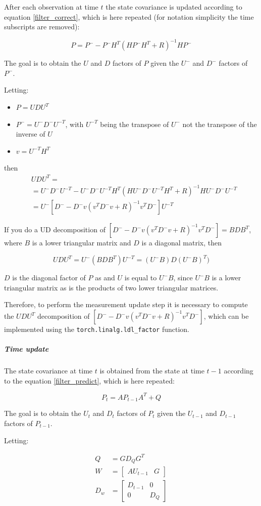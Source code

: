 \documentclass{article}
\begin{document}
After each observation at time $t$ the state covariance is updated according to equation \ref{filter_correct}, which is here repeated (for notation simplicity the time subscripts are removed):

$$ P = P^- - P^-H^T(HP^-H^T + R)^{-1}HP^-$$

The goal is to obtain the $U$ and $D$ factors of $P$ given the $U^-$ and $D^-$ factors of $P^-$.

Letting:
\begin{itemize}
    \item $P = UDU^T$
    \item $P^- = U^-D^-U^{-T}$, with $U^{-T}$ being the transpose of $U^-$ not the transpose of the inverse of $U$
    \item $v = U^{-T}H^T$
\end{itemize}
then 
\begin{align}
    &UDU^T = \\
    &= U^-D^-U^{-T} - U^-D^-U^{-T}H^T\left(HU^-D^-U^{-T}H^T + R\right)^{-1}HU^-D^-U^{-T} \\
    &= U^-\left[D^- - D^-v(v^TD^-v+R)^{-1}v^TD^- \right]U^{-T}
\end{align}

If you do a UD decomposition of $\left[D^- - D^-v(v^TD^-v+R)^{-1}v^TD^- \right] = BDB^T$, where $B$ is a lower triangular matrix and $D$ is a diagonal matrix, then 

\[ UDU^T = U^-(BDB^T)U^{-T} = (U^-B)D(U^-B)^{T}) \]

$D$ is the diagonal factor of $P$ as and $U$ is equal to $U^-B$, since $U^-B$ is a lower triangular matrix as is the products of two lower triangular matrices.

Therefore, to perform the measurement update step it is necessary to compute the $UDU^T$ decomposition of $\left[D^- - D^-v(v^TD^-v+R)^{-1}v^TD^- \right]$, which can be implemented using the \verb|torch.linalg.ldl_factor| function.

\subparagraph{Time update}

The state covariance at time $t$ is obtained from the state at time $t-1$ according to the equation \ref{filter_predict}, which is here repeated:

$$ P_t = AP_{t-1}A^T + Q$$

The goal is to obtain the $U_t$ and $D_t$ factors of $P_t$ given the $U_{t-1}$ and $D_{t-1}$ factors of $P_{t-1}$.

Letting:

\begin{align}
    Q &= GD_QG^T\\
    W &= \begin{bmatrix}AU_{t-1}&G\end{bmatrix}\\
    D_w &= \begin{bmatrix}D_{t-1} & 0 \\ 0& D_Q \end{bmatrix}
\end{align}
\end{document}
